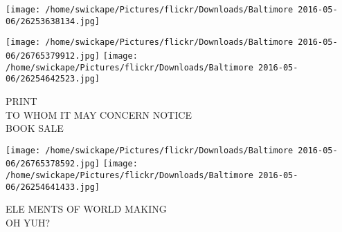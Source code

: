 \documentclass[10pt,letterpaper]{article}
\begin{document}
\texttt{[image: /home/swickape/Pictures/flickr/Downloads/Baltimore 2016-05-06/26253638134.jpg]}

\vspace{0.25in}
\texttt{[image: /home/swickape/Pictures/flickr/Downloads/Baltimore 2016-05-06/26765379912.jpg]}
\texttt{[image: /home/swickape/Pictures/flickr/Downloads/Baltimore 2016-05-06/26254642523.jpg]}

PRINT\\
TO WHOM IT MAY CONCERN NOTICE\\
BOOK SALE\\
\pagebreak

\texttt{[image: /home/swickape/Pictures/flickr/Downloads/Baltimore 2016-05-06/26765378592.jpg]}
\texttt{[image: /home/swickape/Pictures/flickr/Downloads/Baltimore 2016-05-06/26254641433.jpg]}

ELE MENTS OF WORLD MAKING\\
OH YUH?\\
\pagebreak
\end{document}
